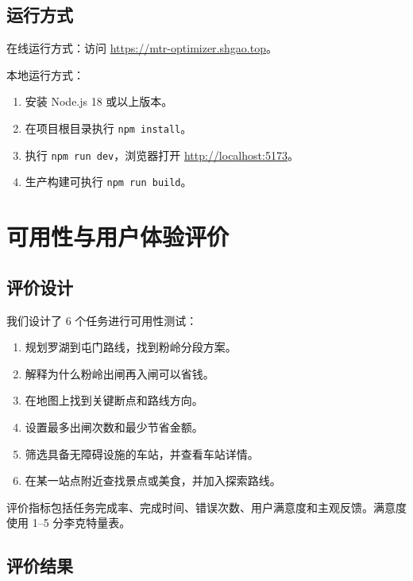 \documentclass[UTF8,a4paper,11pt]{ctexart}
\begin{document}
\subsection{运行方式}

在线运行方式：访问 \url{https://mtr-optimizer.shgao.top}。

本地运行方式：
\begin{enumerate}
  \item 安装 Node.js 18 或以上版本。
  \item 在项目根目录执行 \texttt{npm install}。
  \item 执行 \texttt{npm run dev}，浏览器打开 \url{http://localhost:5173}。
  \item 生产构建可执行 \texttt{npm run build}。
\end{enumerate}

\section{可用性与用户体验评价}

\subsection{评价设计}

我们设计了 6 个任务进行可用性测试：
\begin{enumerate}
  \item 规划罗湖到屯门路线，找到粉岭分段方案。
  \item 解释为什么粉岭出闸再入闸可以省钱。
  \item 在地图上找到关键断点和路线方向。
  \item 设置最多出闸次数和最少节省金额。
  \item 筛选具备无障碍设施的车站，并查看车站详情。
  \item 在某一站点附近查找景点或美食，并加入探索路线。
\end{enumerate}

评价指标包括任务完成率、完成时间、错误次数、用户满意度和主观反馈。满意度使用 1--5 分李克特量表。

\subsection{评价结果}
\end{document}
